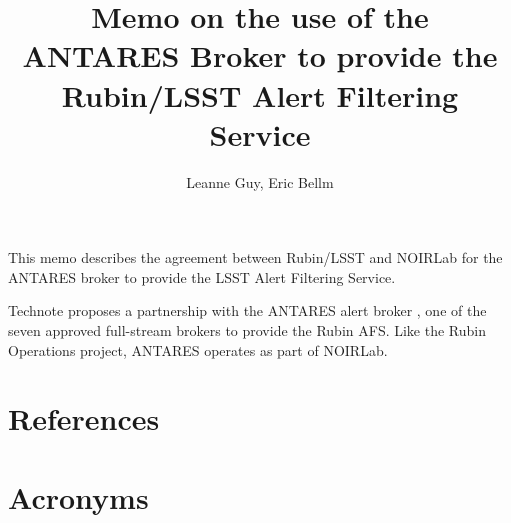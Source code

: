 \documentclass[DM,authoryear]{lsstdoc}
\title{Memo on the use of the ANTARES Broker to provide the Rubin/LSST Alert Filtering Service}
\author{Leanne Guy, Eric Bellm
}
\date{\vcsDate}
\begin{document}
        
\mkmemotitle

This memo describes the agreement between Rubin/LSST and NOIRLab for the ANTARES broker to provide the LSST Alert Filtering Service.

Technote  proposes a partnership with the ANTARES alert broker \citep{2021AJ....161..107M}, one of the seven approved full-stream brokers to provide the Rubin AFS.
Like the Rubin Operations project, ANTARES operates as part of NOIRLab.

\clearpage
\appendix
\section{References} \label{sec:bib}
\renewcommand{\refname}{} %


\section{Acronyms} \label{sec:acronyms}

\end{document}

